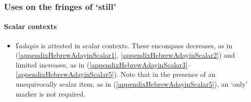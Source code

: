 \subsubsection{Uses on the fringes of \lq{}still\rq{}}
\paragraph{Scalar contexts}\label{appendixHebrewAdayinScalar}
\begin{itemize}
	\item \textit{ʕadayin} is attested in scalar contexts. These encompass decreases, as in (\ref{appendixHebrewAdayinScalar1}, \ref{appendixHebrewAdayinScalar2}) and limited increases, as in (\ref{appendixHebrewAdayinScalar3}–\ref{appendixHebrewAdayinScalar5}). Note that in the presence of an unequivocally scalar item, as in (\ref{appendixHebrewAdayinScalar5}), an \lq only\rq{ }marker is not required.
\end{itemize}

